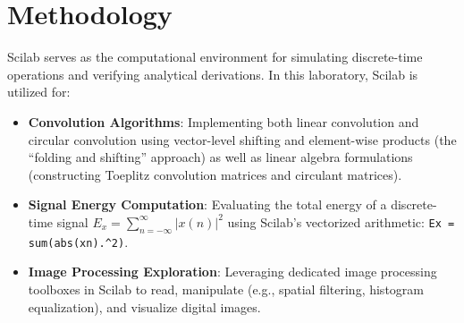 \documentclass[12pt,a4paper]{article}
\begin{document}
\section{Methodology}
Scilab serves as the computational environment for simulating discrete-time operations and verifying analytical derivations. In this laboratory, Scilab is utilized for:
\begin{itemize}
    \item \textbf{Convolution Algorithms}: Implementing both linear convolution and circular convolution using vector-level shifting and element-wise products (the ``folding and shifting'' approach) as well as linear algebra formulations (constructing Toeplitz convolution matrices and circulant matrices).
    \item \textbf{Signal Energy Computation}: Evaluating the total energy of a discrete-time signal $E_x = \sum_{n=-\infty}^{\infty} |x(n)|^2$ using Scilab's vectorized arithmetic: \texttt{Ex = sum(abs(xn).\^{}2)}.
    \item \textbf{Image Processing Exploration}: Leveraging dedicated image processing toolboxes in Scilab to read, manipulate (e.g., spatial filtering, histogram equalization), and visualize digital images.
\end{itemize}
\end{document}
